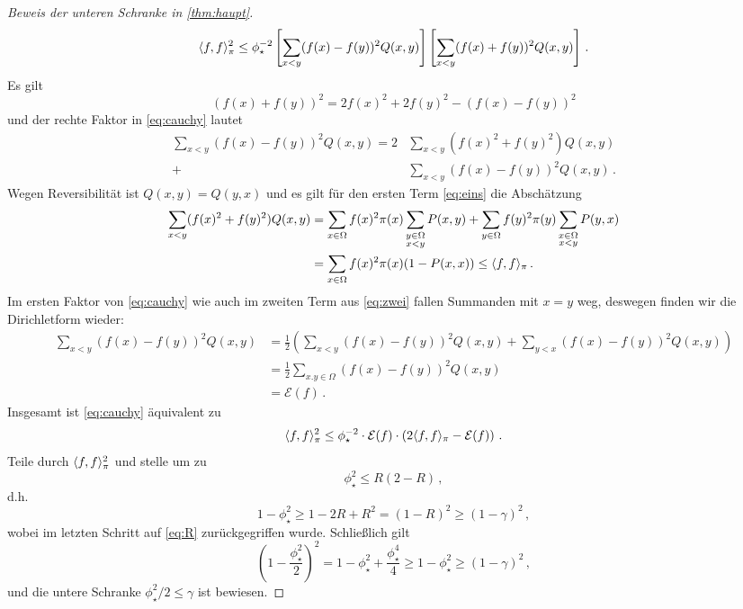 \documentclass[ngerman,a4paper,11pt]{scrartcl}
\newcommand{\diri}{\mathcal{E}}
\DeclarePairedDelimiter{\sprod}{\langle}{\rangle}	%
\begin{document}
\begin{proof}[Beweis der unteren Schranke in \cref{thm:haupt}]
\begin{equation}
  \label{eq:cauchy}
  \sprod{f,f}_\pi^2\leq\phi_\star^{-2}\left[ \sum_{x<y}(f(x)-f(y))^2Q(x,y) \right]\left[ \sum_{x<y}(f(x)+f(y))^2Q(x,y) \right]\, .
 \end{equation}
 Es gilt
 \begin{equation*}
  (f(x)+f(y))^2=2f(x)^2+2f(y)^2-(f(x)-f(y))^2 
 \end{equation*}
 und der rechte Faktor in \cref{eq:cauchy} lautet
 \begin{align}
  \sum_{x<y}(f(x)-f(y))^2Q(x,y)=2&\sum_{x<y}(f(x)^2+f(y)^2)Q(x,y) \label{eq:eins} \\
  +&\sum_{x<y}(f(x)-f(y))^2Q(x,y)\, . \label{eq:zwei}
 \end{align}
 Wegen Reversibilität ist $Q(x,y)=Q(y,x)$ und es gilt für den ersten Term
 \eqref{eq:eins} die Abschätzung
 \begin{align*}
  \sum_{x<y}(f(x)^2+f(y)^2)Q(x,y)&=\sum_{x\in\Omega}f(x)^2\pi(x)\sum_{\substack{y\in\Omega\\x<y}}P(x,y)+\sum_{y\in\Omega}f(y)^2\pi(y)\sum_{\substack{x\in\Omega\\x<y}}P(y,x) \\
  &=\sum_{x\in\Omega}f(x)^2\pi(x)(1-P(x,x))\leq\sprod{f,f}_\pi \, .
 \end{align*}
 Im ersten Faktor von \cref{eq:cauchy} wie auch im zweiten Term aus
 \cref{eq:zwei} fallen Summanden mit $x=y$ weg, deswegen finden wir die
 Dirichletform wieder:
 \begin{align*}
  \sum_{x<y}(f(x)-f(y))^2Q(x,y)&=\frac{1}{2}\left( \sum_{x<y}(f(x)-f(y))^2Q(x,y)+\sum_{y<x}(f(x)-f(y))^2Q(x,y)\right)\\
  &=\frac{1}{2}\sum_{x.y\in\Omega}(f(x)-f(y))^2Q(x,y) \\
  &=\diri(f)\, .
 \end{align*}
 Insgesamt ist \cref{eq:cauchy} äquivalent zu
 \begin{equation*}
  \sprod{f,f}_\pi^2\leq\phi_\star^{-2}\cdot\diri(f)\cdot \left(2\sprod{f,f}_\pi-\diri(f)\right) \, .
 \end{equation*}
 Teile durch $\sprod{f,f}_\pi^2$ und stelle um zu
 \begin{equation*}
  \phi_\star^2\leq R(2-R)\, ,
 \end{equation*}
 d.h.
 \begin{equation*}
  1-\phi_\star^2\geq1-2R+R^2=(1-R)^2\geq(1-\gamma)^2\, , 
 \end{equation*}
 wobei im letzten Schritt auf \cref{eq:R} zurückgegriffen wurde. Schließlich gilt
 \begin{equation*}
  \left( 1-\frac{\phi_\star^2}{2} \right)^2=1-\phi_\star^2+\frac{\phi_\star^4}{4}\geq 1-\phi_\star^2\geq (1-\gamma)^2\, , 
 \end{equation*}
 und die untere Schranke $\phi_\star^2/2\leq\gamma$ ist bewiesen.
\end{proof}
\printbibliography
\end{document}
